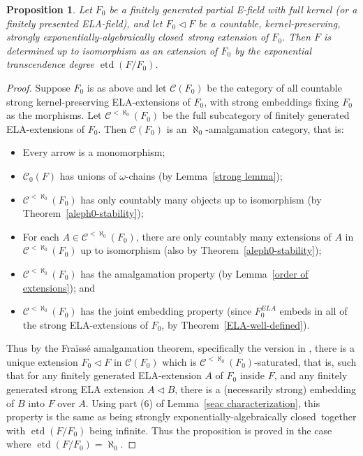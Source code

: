 \documentclass[12pt]{amsart}
\newtheorem{prop}{Proposition}[section]
\theoremstyle{definition}
\begin{document}
\begin{prop}\label{etd determines extension}
  Let $F_0$ be a finitely generated partial E-field with full kernel (or a finitely presented ELA-field), and let $F_0 {\ensuremath{\lhd}} F$ be a countable, kernel-preserving, {strongly exponentially-algebraically closed}\ strong extension of $F_0$. Then $F$ is determined up to isomorphism as an extension of $F_0$ by the exponential transcendence degree $\operatorname{etd}(F/F_0)$. 
\end{prop}
\begin{proof}
Suppose $F_0$ is as above and let ${\ensuremath{\mathcal{C}}}(F_0)$ be the category of all countable strong kernel-preserving ELA-extensions of $F_0$, with strong embeddings fixing $F_0$ as the morphisms. Let ${\ensuremath{\mathcal{C}}}^{<\aleph_0}(F_0)$ be the full subcategory of finitely generated ELA-extensions of $F_0$. Then ${\ensuremath{\mathcal{C}}}(F_0)$ is an $\aleph_0$-amalgamation category, that is:
\begin{itemize}
  \item Every arrow is a monomorphism;
  \item ${\ensuremath{\mathcal{C}}}_0(F)$ has unions of $\omega$-chains (by Lemma~\ref{strong lemma});
  \item ${\ensuremath{\mathcal{C}}}^{<\aleph_0}(F_0)$ has only countably many objects up to isomorphism (by Theorem~\ref{aleph0-stability});
  \item For each $A \in {\ensuremath{\mathcal{C}}}^{<\aleph_0}(F_0)$, there are only countably many extensions of $A$ in ${\ensuremath{\mathcal{C}}}^{<\aleph_0}(F_0)$ up to isomorphism (also by Theorem~\ref{aleph0-stability});
  \item ${\ensuremath{\mathcal{C}}}^{<\aleph_0}(F_0)$ has the amalgamation property (by Lemma~\ref{order of extensions}); and
  \item ${\ensuremath{\mathcal{C}}}^{<\aleph_0}(F_0)$ has the joint embedding property (since $F_0^{ELA}$ embeds in all of the strong ELA-extensions of $F_0$, by Theorem~\ref{ELA-well-defined}).
\end{itemize}  
 Thus by the Fra\"iss\'e amalgamation theorem, specifically the version in \cite[Theorem~2.18]{TEDESV}, there is a unique extension $F_0 {\ensuremath{\lhd}} F$ in ${\ensuremath{\mathcal{C}}}(F_0)$ which is ${\ensuremath{\mathcal{C}}}^{<\aleph_0}(F_0)$-saturated, that is, such that for any finitely generated ELA-extension $A$ of $F_0$ inside $F$, and any finitely generated strong ELA extension $A {\ensuremath{\lhd}} B$, there is a (necessarily strong) embedding of $B$ into $F$ over $A$. Using part (6) of Lemma~\ref{seac characterization}, this property is the same as being {strongly exponentially-algebraically closed}\ together with $\operatorname{etd}(F/F_0)$ being infinite. Thus the proposition is proved in the case where $\operatorname{etd}(F/F_0) = \aleph_0$.
 

\end{proof}
\end{document}
